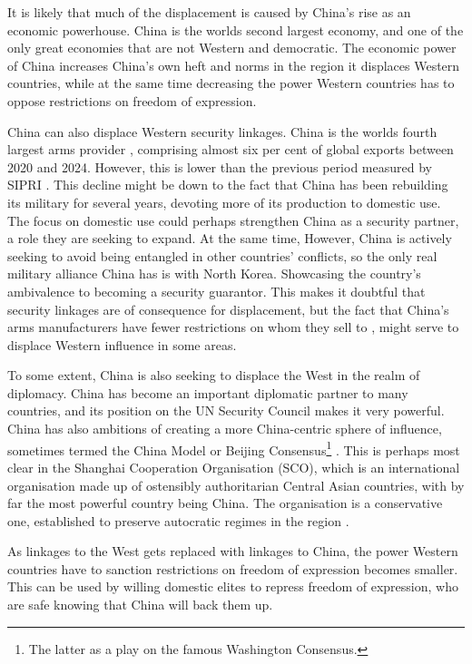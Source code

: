 It is likely that much of the displacement is caused by China's rise as an economic powerhouse. China is the worlds second largest economy, and one of the only great economies that are not Western and democratic. The economic power of China increases China's own heft and norms in the region it displaces Western countries, while at the same time decreasing the power Western countries has to oppose restrictions on freedom of expression. 

China can also displace Western security linkages. China is the worlds fourth largest arms provider \citep{george_trends_2025, gunter_chinas_2024}, comprising almost six per cent of global exports between 2020 and 2024. However, this is lower than the previous period measured by SIPRI \citep{george_trends_2025}. This decline might be down to the fact that China has been rebuilding its military for several years, devoting more of its production to domestic use. The focus on domestic use could perhaps strengthen China as a security partner, a role they are seeking to expand. At the same time, However, China is actively seeking to avoid being entangled in other countries' conflicts, so the only real military alliance China has is with North Korea. Showcasing the country's ambivalence to becoming a security guarantor. This makes it doubtful that security linkages are of consequence for displacement, but the fact that China's arms manufacturers have fewer restrictions on whom they sell to \citep{gunter_chinas_2024}, might serve to displace Western influence in some areas.

To some extent, China is also seeking to displace the West in the realm of diplomacy. China has become an important diplomatic partner to many countries, and its position on the UN Security Council makes it very powerful. China has also ambitions of creating a more China-centric sphere of influence, sometimes termed the China Model or Beijing Consensus\footnote{The latter as a play on the famous Washington Consensus.} \citep{ambrosio_rise_2012, economy_exporting_2020}. This is perhaps most clear in the Shanghai Cooperation Organisation (SCO), which is an international organisation made up of ostensibly authoritarian Central Asian countries, with by far the most powerful country being China. The organisation is a conservative one, established to preserve autocratic regimes in the region \citep[p. 1322]{ambrosio_catching_2008}.

As linkages to the West gets replaced with linkages to China, the power Western countries have to sanction restrictions on freedom of expression becomes smaller. This can be used by willing domestic elites to repress freedom of expression, who are safe knowing that China will back them up.

